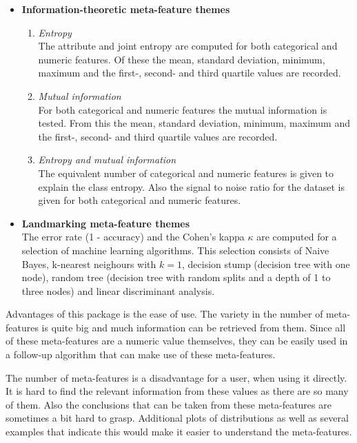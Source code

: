 \documentclass[10pt,a4paper]{report}
\begin{document}
\begin{itemize}
		\item \textbf{Information-theoretic meta-feature themes} \\ 
		\begin{enumerate}
			\item \textit{Entropy} \\
			The attribute and joint entropy are computed for both categorical and numeric features. Of these the mean, standard deviation, minimum, maximum and the first-, second- and third quartile values are recorded.
			\item \textit{Mutual information} \\
			For both categorical and numeric features the mutual information is tested. From this the mean, standard deviation, minimum, maximum and the first-, second- and third quartile values are recorded.
			\item \textit{Entropy and mutual information} \\
			The equivalent number of categorical and numeric features is given to explain the class entropy. Also the signal to noise ratio for the dataset is given for both categorical and numeric features.
		\end{enumerate}
		\item \textbf{Landmarking meta-feature themes} \\
		The error rate (1 - accuracy) and the Cohen's kappa $\kappa$ are computed for a selection of machine learning algorithms. This selection consists of Naive Bayes, k-nearest neighours with $k=1$, decision stump (decision tree with one node), random tree (decision tree with random splits and a depth of 1 to three nodes) and linear discriminant analysis.
	\end{itemize}
	
	Advantages of this package is the ease of use. The variety in the number of meta-features is quite big and much information can be retrieved from them. Since all of these meta-features are a numeric value themselves, they can be easily used in a follow-up algorithm that can make use of these meta-features. 
	
	The number of meta-features is a disadvantage for a user, when using it directly. It is hard to find the relevant information from these values as there are so many of them. Also the conclusions that can be taken from these meta-features are sometimes a bit hard to grasp. Additional plots of distributions as well as several examples that indicate this would make it easier to understand the meta-features.
	
\end{document}
